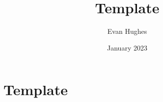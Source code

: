 \documentclass{article}
\title{Template}
\author{Evan Hughes}
\date{January 2023}
\begin{document}
\maketitle
\section{Template}
\end{document}

